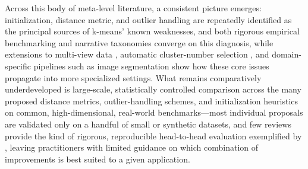 Across this body of meta-level literature, a consistent picture emerges: initialization, distance metric, and outlier handling are repeatedly identified as the principal sources of k-means' known weaknesses, and both rigorous empirical benchmarking \cite{franti2019how} and narrative taxonomies \cite{chong2021means,oti2021comprehensive} converge on this diagnosis, while extensions to multi-view data \cite{yang2019feature}, automatic cluster-number selection \cite{ikotun2025cluster}, and domain-specific pipelines such as image segmentation \cite{sattarov2023unveiling,mukherjee2025survey,farhang2017face} show how these core issues propagate into more specialized settings. What remains comparatively underdeveloped is large-scale, statistically controlled comparison across the many proposed distance metrics, outlier-handling schemes, and initialization heuristics on common, high-dimensional, real-world benchmarks---most individual proposals \cite{sthakare2015performance,raeisi2022distance,shrifan2021adaptive,bhavani2022efficient} are validated only on a handful of small or synthetic datasets, and few reviews \cite{chong2021means,oti2021comprehensive,zhao2021means} provide the kind of rigorous, reproducible head-to-head evaluation exemplified by \cite{franti2019how}, leaving practitioners with limited guidance on which combination of improvements is best suited to a given application.

